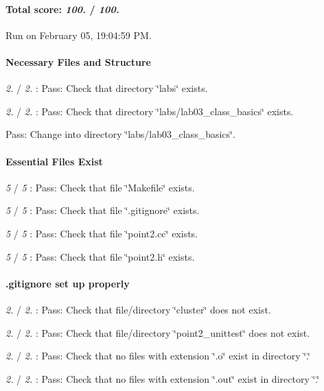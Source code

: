 \paragraph*{Total score\+: {\itshape 100.} / {\itshape 100.}}

Run on February 05, 19\+:04\+:59 PM.

\paragraph*{Necessary Files and Structure}


\begin{DoxyItemize}
\item {\itshape 2.} / {\itshape 2.} \+: Pass\+: Check that directory \char`\"{}labs\char`\"{} exists.
\item {\itshape 2.} / {\itshape 2.} \+: Pass\+: Check that directory \char`\"{}labs/lab03\+\_\+class\+\_\+basics\char`\"{} exists.
\item Pass\+: Change into directory \char`\"{}labs/lab03\+\_\+class\+\_\+basics\char`\"{}.
\end{DoxyItemize}

\paragraph*{Essential Files Exist}


\begin{DoxyItemize}
\item {\itshape 5} / {\itshape 5} \+: Pass\+: Check that file \char`\"{}\+Makefile\char`\"{} exists.
\item {\itshape 5} / {\itshape 5} \+: Pass\+: Check that file \char`\"{}.\+gitignore\char`\"{} exists.
\item {\itshape 5} / {\itshape 5} \+: Pass\+: Check that file \char`\"{}point2.\+cc\char`\"{} exists.
\item {\itshape 5} / {\itshape 5} \+: Pass\+: Check that file \char`\"{}point2.\+h\char`\"{} exists.
\end{DoxyItemize}

\paragraph*{.gitignore set up properly}


\begin{DoxyItemize}
\item {\itshape 2.} / {\itshape 2.} \+: Pass\+: Check that file/directory \char`\"{}cluster\char`\"{} does not exist.
\item {\itshape 2.} / {\itshape 2.} \+: Pass\+: Check that file/directory \char`\"{}point2\+\_\+unittest\char`\"{} does not exist.
\item {\itshape 2.} / {\itshape 2.} \+: Pass\+: Check that no files with extension \char`\"{}.\+o\char`\"{} exist in directory \char`\"{}.\char`\"{}
\item {\itshape 2.} / {\itshape 2.} \+: Pass\+: Check that no files with extension \char`\"{}.\+out\char`\"{} exist in directory \char`\"{}.\char`\"{}
\end{DoxyItemize}

